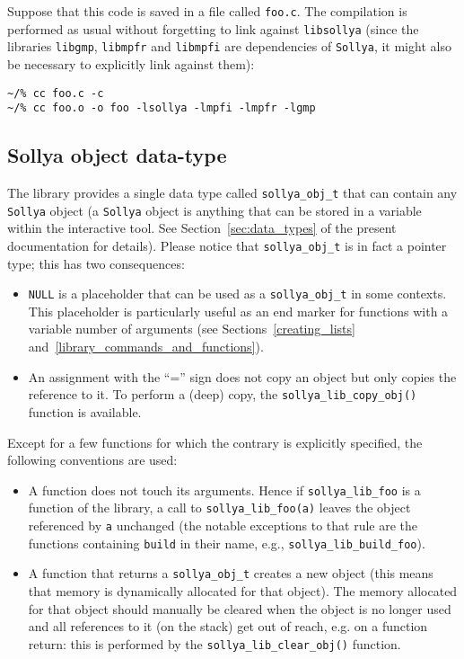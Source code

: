 \documentclass[a4paper]{article}
\newcommand{\sollya}{\texttt{Sollya}\xspace}
\begin{document}
Suppose that this code is saved in a file called \texttt{foo.c}. The compilation is performed as usual without forgetting to link against \texttt{libsollya} (since the libraries \texttt{libgmp}, \texttt{libmpfr} and \texttt{libmpfi} are dependencies of \sollya, it might also be necessary to explicitly link against them):
\begin{center}\begin{minipage}{15cm}\begin{Verbatim}[frame=single]
~/% cc foo.c -c
~/% cc foo.o -o foo -lsollya -lmpfi -lmpfr -lgmp
\end{Verbatim}
\end{minipage}\end{center}

 \subsection{Sollya object data-type}
The library provides a single data type called \texttt{sollya\_obj\_t} that can contain any \sollya object (a \sollya object is anything that can be stored in a variable within the interactive tool. See Section~\ref{sec:data_types} of the present documentation for details). Please notice that \texttt{sollya\_obj\_t} is in fact a pointer type; this has two consequences:
\begin{itemize}
\item \texttt{NULL} is a placeholder that can be used as a \texttt{sollya\_obj\_t} in some contexts. This placeholder is particularly useful as an end marker for functions with a variable number of arguments (see Sections~\ref{creating_lists} and~\ref{library_commands_and_functions}).
\item An assignment with the ``='' sign does not copy an object but only copies the reference to it. To perform a (deep) copy, the \texttt{sollya\_lib\_copy\_obj()} function is available.
\end{itemize}
Except for a few functions for which the contrary is explicitly specified, the following conventions are used:
\begin{itemize}
\item  A function does not touch its arguments. Hence if \texttt{sollya\_lib\_foo} is a function of the library, a call to \texttt{sollya\_lib\_foo(a)} leaves the object referenced by \texttt{a} unchanged (the notable exceptions to that rule are the functions containing \verb|build| in their name, e.g., \texttt{sollya\_lib\_build\_foo}).
\item A function that returns a \texttt{sollya\_obj\_t} creates a new object (this means that memory is dynamically allocated for that object). The memory allocated for that object should manually be cleared when the object is no longer used and all references to it (on the stack) get out of reach, e.g. on a function return: this is performed by the \texttt{sollya\_lib\_clear\_obj()} function.
\end{itemize}
\end{document}
